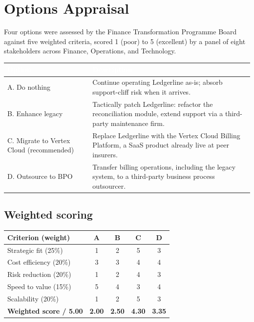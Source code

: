 \section{Options Appraisal}

Four options were assessed by the Finance Transformation Programme Board against five weighted
criteria, scored 1 (poor) to 5 (excellent) by a panel of eight stakeholders across Finance,
Operations, and Technology.

\begin{center}
\footnotesize
\begin{tabularx}{\linewidth}{@{}p{3.1cm}Y@{}}
\toprule
{}
\textcolor{white}{\textbf{Option}} & \textcolor{white}{\textbf{Description}} \\
\midrule
A. Do nothing & Continue operating Ledgerline as-is; absorb support-cliff risk when it arrives. \\
B. Enhance legacy & Tactically patch Ledgerline: refactor the reconciliation module, extend
   support via a third-party maintenance firm. \\
C. Migrate to Vertex Cloud (recommended) & Replace Ledgerline with the Vertex Cloud Billing
   Platform, a SaaS product already live at peer insurers. \\
D. Outsource to BPO & Transfer billing operations, including the legacy system, to a
   third-party business process outsourcer. \\
\bottomrule
\end{tabularx}
\end{center}

\subsection{Weighted scoring}

\begin{center}
\footnotesize
\begin{tabular}{@{}l c c c c@{}}
\toprule
\textbf{Criterion (weight)} & \textbf{A} & \textbf{B} & \textbf{C} & \textbf{D} \\
\midrule
Strategic fit (25\%)     & 1 & 2 & 5 & 3 \\
Cost efficiency (20\%)   & 3 & 3 & 4 & 4 \\
Risk reduction (20\%)    & 1 & 2 & 4 & 3 \\
Speed to value (15\%)    & 5 & 4 & 3 & 4 \\
Scalability (20\%)       & 1 & 2 & 5 & 3 \\
\midrule
\rowcolor{palegold}
\textbf{Weighted score / 5.00} & \textbf{2.00} & \textbf{2.50} & \textbf{4.30} & \textbf{3.35} \\
\bottomrule
\end{tabular}
\end{center}

